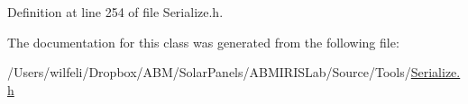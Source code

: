 Definition at line 254 of file Serialize.\+h.



The documentation for this class was generated from the following file\+:\begin{DoxyCompactItemize}
\item 
/\+Users/wilfeli/\+Dropbox/\+A\+B\+M/\+Solar\+Panels/\+A\+B\+M\+I\+R\+I\+S\+Lab/\+Source/\+Tools/\hyperlink{_serialize_8h}{Serialize.\+h}\end{DoxyCompactItemize}
